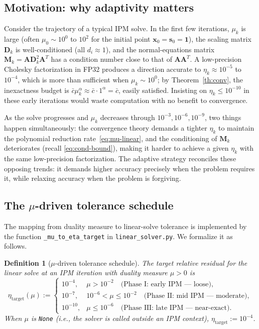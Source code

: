 \documentclass[11pt,twoside]{article}
\newtheorem{definition}{Definition}[section]
\newcommand{\bA}{\mathbf{A}}
\newcommand{\bx}{\mathbf{x}}
\newcommand{\bs}{\mathbf{s}}
\newcommand{\bD}{\mathbf{D}}
\newcommand{\bM}{\mathbf{M}}
\begin{document}
\subsection{Motivation: why adaptivity matters}

Consider the trajectory of a typical IPM solve.  In the first few
iterations, $\mu_k$ is large (often $\mu_0 \sim 10^0$ to $10^2$ for the
initial point $\bx_0 = \bs_0 = \mathbf{1}$), the scaling matrix
$\bD_k$ is well-conditioned (all $d_i \approx 1$), and the normal-equations
matrix $\bM_k = \bA\bD_k^2\bA^T$ has a condition number close to that of
$\bA\bA^T$.  A low-precision Cholesky factorization in FP32 produces a
direction accurate to $\eta_k \approx 10^{-5}$ to $10^{-4}$, which is more
than sufficient when $\mu_k \sim 10^0$; by Theorem~\ref{th:conv}, the
inexactness budget is $\bar{c}\mu_k^\alpha \approx \bar{c} \cdot 1^\alpha
= \bar{c}$, easily satisfied.  Insisting on $\eta_k \le 10^{-10}$ in these
early iterations would waste computation with no benefit to convergence.

As the solve progresses and $\mu_k$ decreases through $10^{-3}, 10^{-6},
10^{-9}$, two things happen simultaneously: the convergence theory demands a
tighter $\eta_k$ to maintain the polynomial reduction
rate~\eqref{eq:mu-linear}, and the conditioning of $\bM_k$ deteriorates
(recall \eqref{eq:cond-bound}), making it harder to achieve a given
$\eta_k$ with the same low-precision factorization.  The adaptive strategy
reconciles these opposing trends: it demands higher accuracy precisely when
the problem requires it, while relaxing accuracy when the problem is
forgiving.

\subsection{The $\mu$-driven tolerance schedule}
\label{sec:mu-schedule}

The mapping from duality measure to linear-solve tolerance is implemented
by the function \texttt{\_mu\_to\_eta\_target} in
\texttt{linear\_solver.py}.  We formalize it as follows.

\begin{definition}[$\mu$-driven tolerance schedule]
  \label{def:mu-schedule}
  The \emph{target relative residual} for the linear solve at an IPM
  iteration with duality measure $\mu > 0$ is
  \begin{equation}
    \boxed{\eta_{\text{target}}(\mu) :=
    \begin{cases}
      10^{-4},  & \mu > 10^{-2}
        \quad \text{(Phase I: early IPM — loose)}, \\[6pt]
      10^{-7},  & 10^{-6} < \mu \le 10^{-2}
        \quad \text{(Phase II: mid IPM — moderate)}, \\[6pt]
      10^{-10}, & \mu \le 10^{-6}
        \quad \text{(Phase III: late IPM — near-exact)}.
    \end{cases}}
    \label{eq:mu-schedule}
  \end{equation}
  When $\mu$ is \texttt{None} (i.e., the solver is called outside an IPM
  context), $\eta_{\text{target}} := 10^{-4}$.
\end{definition}
\end{document}
